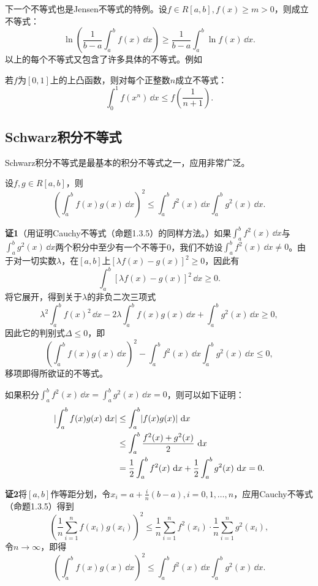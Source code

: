 下一个不等式也是Jensen不等式的特例。设$f\in R[a,b],f(x)\ge m>0$，则成立不等式：
\[
  \ln\left(\frac1{b-a}\int_a^bf(x)\,\dd x\right)
  \ge\frac1{b-a}\int_a^b\ln f(x)\,\dd x.
\]
以上的每个不等式又包含了许多具体的不等式。例如

\begin{xexample}[11.2.2]
若$f$为$[0,1]$上的上凸函数，则对每个正整数$n$成立不等式：
\[
  \int_0^1f(x^n)\,\dd x\le f\left(\frac1{n+1}\right).
\]
\end{xexample}

\subsection{Schwarz积分不等式}

Schwarz积分不等式是最基本的积分不等式之一，应用非常广泛。

\begin{xproposition}[11.2.2（Schwarz积分不等式）]
设$f,g\in R[a,b]$，则
\[
  \left(\int_a^bf(x)g(x)\,\dd x\right)^2
  \le\int_a^bf^2(x)\,\dd x\int_a^bg^2(x)\,\dd x.
\]
\end{xproposition}

\begin{xproof}
\textbf{证1}\quad （用证明Cauchy不等式（命题1.3.5）的同样方法。）如果$\int_a^bf^2(x)\,\dd x$与$\int_a^bg^2(x)\,\dd x$两个积分中至少有一个不等于0，我们不妨设$\int_a^bf^2(x)\,\dd x\ne0$。由于对一切实数$\lambda$，在$[a,b]$上$[\lambda f(x)-g(x)]^2\ge0$，因此有
\[
  \int_a^b[\lambda f(x)-g(x)]^2\,\dd x\ge0.
\]
将它展开，得到关于$\lambda$的非负二次三项式
\[
  \lambda^2\int_a^bf(x)^2\,\dd x-2\lambda\int_a^bf(x)g(x)\,\dd x+\int_a^bg^2(x)\,\dd x\ge0,
\]
因此它的判别式$\Delta\le0$，即
\[
  \left(\int_a^bf(x)g(x)\,\dd x\right)^2
  -\int_a^bf^2(x)\,\dd x\int_a^bg^2(x)\,\dd x\le0,
\]
移项即得所欲证的不等式。

如果积分$\int_a^bf^2(x)\,\dd x=\int_a^bg^2(x)\,\dd x=0$，则可以如下证明：
\begin{align*}
\lvert\int_a^bf(x)g(x)\,\mathop{}\!\mathrm{d} x\rvert
&\le\int_a^b\lvert f(x)g(x)\rvert\,\mathop{}\!\mathrm{d} x\\
&\le\int_a^b\frac{f^2(x)+g^2(x)}2\,\mathop{}\!\mathrm{d} x\\
&=\frac12\int_a^bf^2(x)\,\mathop{}\!\mathrm{d} x+\frac12\int_a^bg^2(x)\,\mathop{}\!\mathrm{d} x=0.
\end{align*}

\textbf{证2}\quad 将$[a,b]$作等距分划，令$x_i=a+\frac in(b-a),i=0,1,\ldots,n$，应用Cauchy不等式（命题1.3.5）得到
\[
  \left(\frac1n\sum_{i=1}^nf(x_i)g(x_i)\right)^2
  \le\frac1n\sum_{i=1}^nf^2(x_i)\cdot\frac1n\sum_{i=1}^ng^2(x_i),
\]
令$n\to\infty$，即得
\[
  \left(\int_a^bf(x)g(x)\,\dd x\right)^2
  \le\int_a^bf^2(x)\,\dd x\int_a^bg^2(x)\,\dd x.
\]
\end{xproof}

